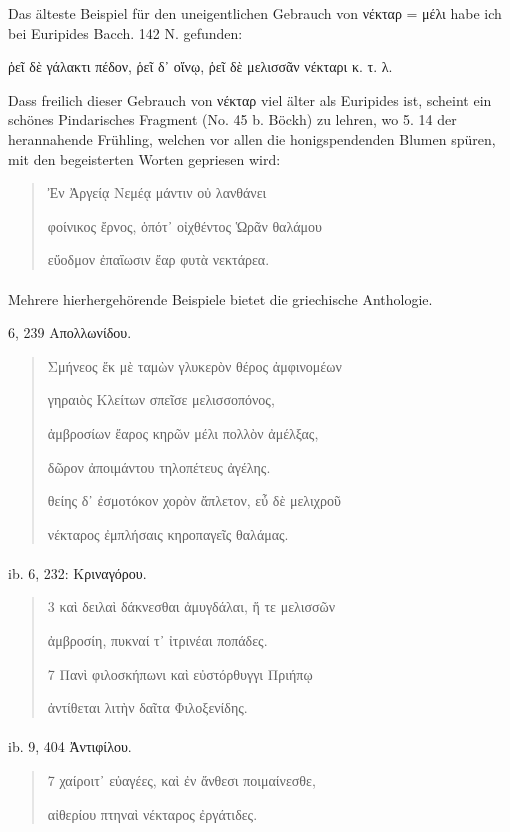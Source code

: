 \documentclass[a4paper, 11pt, oneside]{article}
\begin{document}
Das älteste Beispiel für den uneigentlichen Gebrauch von νέκταρ = μέλι habe ich bei Euripides Bacch. 142 N. gefunden:

ῥεῖ δὲ γάλακτι πέδον, ῥεῖ δ᾽ οἴνῳ, ῥεῖ δὲ μελισσᾶν νέκταρι κ. τ. λ.

Dass freilich dieser Gebrauch von νέκταρ viel älter als Euripides ist, scheint ein schönes Pindarisches Fragment (No. 45 b. Böckh) zu lehren, wo 5. 14 der herannahende Frühling, welchen vor allen die honigspendenden Blumen spüren, mit den begeisterten Worten gepriesen wird:
\begin{quotation}
Ἐν Ἀργείᾳ Νεμέᾳ μάντιν οὐ λανθάνει

φοίνικος ἔρνος, ὁπότ᾽ οἰχθέντος Ὡρᾶν θαλάμου

εὔοδμον ἐπαΐωσιν ἔαρ φυτὰ νεκτάρεα.
\end{quotation}
\paragraph{}
Mehrere hierhergehörende Beispiele bietet die griechische Anthologie.

6, 239 Απολλωνίδου.
\begin{quotation}
Σμήνεος ἔκ μὲ ταμὼν γλυκερὸν θέρος ἀμφινομέων

\hspace*{5mm}γηραιὸς Κλείτων σπεῖσε μελισσοπόνος,

ἀμβροσίων ἔαρος κηρῶν μέλι πολλὸν ἀμέλξας,

\hspace*{5mm}δῶρον ἀποιμάντου τηλοπέτευς ἀγέλης.

θείης δ᾽ ἐσμοτόκον χορὸν ἄπλετον, εὖ δὲ μελιχροῦ

\hspace*{5mm}νέκταρος ἐμπλήσαις κηροπαγεῖς θαλάμας.
\end{quotation}
\paragraph{}
ib. 6, 232: Κριναγόρου.
\begin{quotation}
3 καὶ δειλαὶ δάκνεσθαι ἀμυγδάλαι, ἥ τε μελισσῶν

\hspace*{5mm}ἀμβροσίη, πυκναί τ᾽ ἰτρινέαι ποπάδες.

7 Πανὶ φιλοσκήπωνι καὶ εὐστόρθυγγι Πριήπῳ

\hspace*{5mm}ἀντίθεται λιτὴν δαῖτα Φιλοξενίδης.
\end{quotation}
\paragraph{}
ib. 9, 404 Ἀντιφίλου.
\begin{quotation}
7 χαίροιτ᾽ εὐαγέες, καὶ ἐν ἄνθεσι ποιμαίνεσθε,

\hspace*{5mm}αἰθερίου πτηναὶ νέκταρος ἐργάτιδες.
\end{quotation}
\end{document}
